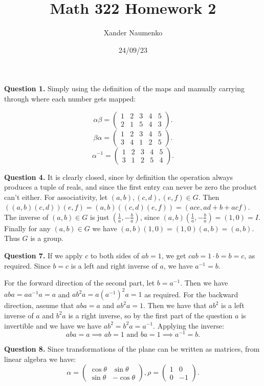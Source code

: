 \documentclass[letterpaper, reqno,11pt]{article}
\begin{document}
\title{Math 322 Homework 2}
\date{24/09/23}
\author{Xander Naumenko}
\maketitle

{\medskip\noindent\bf Question 1.} Simply using the definition of the maps and manually carrying through where each number gets mapped:

\[
    \alpha\beta=\begin{pmatrix} 1&2&3&4&5\\ 2&1&5&4&3 \end{pmatrix} 
.\]
\[
    \beta\alpha=\begin{pmatrix} 1&2&3&4&5\\ 3&4&1&2&5 \end{pmatrix} 
.\]
\[
    \alpha ^{-1}=\begin{pmatrix} 1&2&3&4&5\\ 3&1&2&5&4 \end{pmatrix} 
.\]

{\medskip\noindent\bf Question 4.} It is clearly closed, since by definition the operation always produces a tuple of reals, and since the first entry can never be zero the product can't either. For associativity, let $(a,b),(c,d),(e,f)\in G$. Then $((a,b)(c,d))(e,f)=(a,b)((c,d)(e,f))=(ace, ad+b+acf)$. The inverse of $(a,b)\in G$ is just $(\frac{1}{a}, -\frac{b}{a})$, since $(a,b)(\frac{1}{a},-\frac{b}{a})=(1,0)=I$. Finally for any $(a,b)\in G$ we have $(a,b)(1,0)=(1,0)(a,b)=(a,b)$. Thus $G$ is a group.

{\medskip\noindent\bf Question 7.} If we apply $c$ to both sides of $ab=1$, we get $cab=1\cdot b=b=c$, as required. Since $b=c$ is a left and right inverse of $a$, we have $a^{-1}=b$.

For the forward direction of the second part, let $b=a^{-1}$. Then we have $aba=aa^{-1}a=a$ and $ab^2a=a(a^{-1})^2a=1$ as required. For the backward direction, assume that $aba=a$ and $ab^2a=1$. Then we have that $ab^2$ is a left inverse of $a$ and $b^2a$ is a right inverse, so by the first part of the question $a$ is invertible and we have we have $ab^2=b^2a=a^{-1}$. Applying the inverse:
\[
aba=a\implies ab=1\text{ and }ba=1\implies a^{-1}=b
.\]

{\medskip\noindent\bf Question 8.} Since transformations of the plane can be written as matrices, from linear algebra we have:
\[
    \alpha=\begin{pmatrix} \cos\theta&\sin\theta\\ \sin\theta&-\cos\theta \end{pmatrix}, \rho=\begin{pmatrix} 1&0\\0&-1 \end{pmatrix} 
.\]
\end{document}
